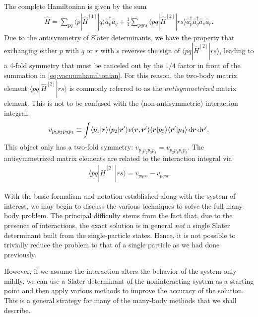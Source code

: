 The complete Hamiltonian is given by the sum
\begin{align}
  \hat{H} = \sum_{p q} \langle p | \hat{H}^{[1]} | q \rangle \hat{a}_p^\dagger \hat{a}_q + \frac{1}{4} \sum_{p q r s} \langle p q | \hat{H}^{[2]} | r s \rangle \hat{a}_p^\dagger \hat{a}_q^\dagger \hat{a}_s \hat{a}_r. \label{eq:vacuumhamiltonian}
\end{align}
Due to the antisymmetry of Slater determinants, we have the property that exchanging either $p$ with $q$ or $r$ with $s$ reverses the sign of $\langle p q | \hat{H}^{[2]} | r s \rangle$, leading to a 4-fold symmetry that must be canceled out by the $1/4$ factor in front of the summation in \eqref{eq:vacuumhamiltonian}.  For this reason, the two-body matrix element $\langle p q | \hat{H}^{[2]} | r s \rangle$ is commonly referred to as the \emph{antisymmetrized} matrix element.  This is not to be confused with the (non-antisymmetric) interaction integral,
\begin{align} \label{eq:interactionintegral}
  v_{p_1 p_2 p_3 p_4} \equiv \int \langle p_1 | \bm{r} \rangle \langle p_2 | \bm{r}' \rangle v(\bm r, \bm r') \langle \bm{r} | p_3 \rangle \langle \bm{r}' | p_4 \rangle \operatorname{d\!} \bm{r} \operatorname{d\!} \bm{r}'.
\end{align}
This object only has a two-fold symmetry: $v_{p_1 p_2 p_3 p_4} = v_{p_2 p_1 p_4 p_3}$.  The antisymmetrized matrix elements are related to the interaction integral via
\begin{align} \label{eq:antisymmetricmatrixelement}
  \langle p q | \hat{H}^{[2]} | r s \rangle = v_{p q r s} - v_{p q s r}
\end{align}

With the basic formalism and notation established along with the system of interest, we may begin to discuss the various techniques to solve the full many-body problem.  The principal difficulty stems from the fact that, due to the presence of interactions, the exact solution is in general \emph{not} a single Slater determinant built from the single-particle states.  Hence, it is not possible to trivially reduce the problem to that of a single particle as we had done previously.

However, if we assume the interaction alters the behavior of the system only mildly, we can use a Slater determinant of the noninteracting system as a starting point and then apply various methods to improve the accuracy of the solution.  This is a general strategy for many of the many-body methods that we shall describe.

